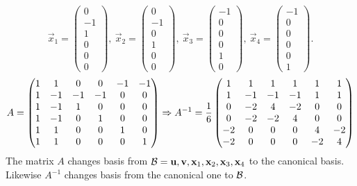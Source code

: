 \documentclass[12pt]{memoir}
\begin{document}
$$\vec x_1=\begin{pmatrix}0\\-1\\1\\0\\0\\0\end{pmatrix},\ \vec x_2=\begin{pmatrix}0\\-1\\0\\1\\0\\0\end{pmatrix},\ \vec x_3=\begin{pmatrix}-1\\0\\0\\0\\1\\0\end{pmatrix},\ \vec x_4=\begin{pmatrix}-1\\0\\0\\0\\0\\1\end{pmatrix}.$$
$$A=\begin{pmatrix}
    1 & 1 & 0 & 0 & -1 & -1 \\
 1 & -1 & -1 & -1 & 0 & 0 \\
 1 & -1 & 1 & 0 & 0 & 0 \\
 1 & -1 & 0 & 1 & 0 & 0 \\
 1 & 1 & 0 & 0 & 1 & 0 \\
 1 & 1 & 0 & 0 & 0 & 1 \\
    \end{pmatrix}\Rightarrow A^{-1}=\frac16\begin{pmatrix}
        1 & 1 & 1 & 1 & 1 & 1 \\
        1 & -1 & -1 & -1 & 1 & 1 \\
        0 & -2 & 4 & -2 & 0 & 0 \\
        0 & -2 & -2 & 4 & 0 & 0 \\
        -2 & 0 & 0 & 0 & 4 & -2 \\
        -2 & 0 & 0 & 0 & -2 & 4 \\
        \end{pmatrix}$$
    The matrix $A$ changes basis from $\mathcal{B}={\mathbf{u},\mathbf{v},\mathbf{x}_1,\mathbf{x}_2,\mathbf{x}_3,\mathbf{x}_4}$ to the canonical basis. Likewise $A^{-1}$ changes basis from the canonical one to $\mathcal{B}$.\par 
\end{document}
